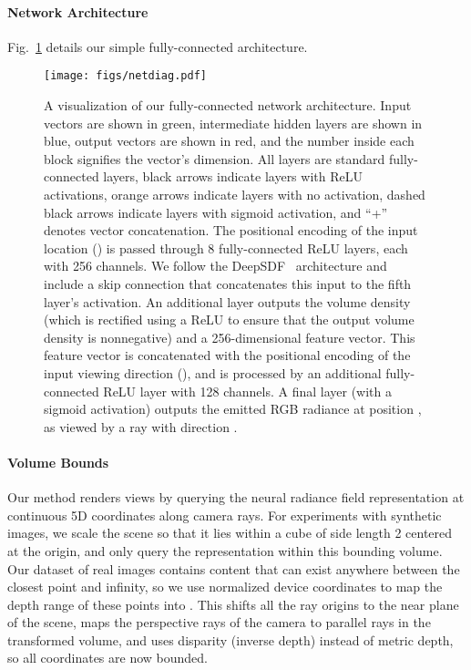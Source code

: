 \documentclass[runningheads]{llncs}
\begin{document}
\paragraph{\textbf{Network Architecture}}  
Fig.~\ref{fig:net} details our simple fully-connected architecture.


\begin{figure}[t]
\centering
\texttt{[image: figs/netdiag.pdf]}
\caption{A visualization of our fully-connected network architecture. Input vectors are shown in green, intermediate hidden layers are shown in blue, output vectors are shown in red, and the number inside each block signifies the vector's dimension. All layers are standard fully-connected layers, black arrows indicate layers with ReLU activations, orange arrows indicate layers with no activation, dashed black arrows indicate layers with sigmoid activation, and ``+'' denotes vector concatenation. The positional encoding of the input location () is passed through 8 fully-connected ReLU layers, each with 256 channels. We follow the DeepSDF~\cite{deepsdf} architecture and include a skip connection that concatenates this input to the fifth layer's activation. An additional layer outputs the volume density  (which is rectified using a ReLU to ensure that the output volume density is nonnegative) and a 256-dimensional feature vector. This feature vector is concatenated with the positional encoding of the input viewing direction (), and is processed by an additional fully-connected ReLU layer with 128 channels. A final layer (with a sigmoid activation) outputs the emitted RGB radiance at position , as viewed by a ray with direction .}
\label{fig:net}
\end{figure}


\paragraph{\textbf{Volume Bounds}}
Our method renders views by querying the neural radiance field representation at continuous 5D coordinates along camera rays. For experiments with synthetic images, we scale the scene so that it lies within a cube of side length 2 centered at the origin, and only query the representation within this bounding volume. Our dataset of real images contains content that can exist anywhere between the closest point and infinity, so we use normalized device coordinates to map the depth range of these points into . This shifts all the ray origins to the near plane of the scene, maps the perspective rays of the camera to parallel rays in the transformed volume, and uses disparity (inverse depth) instead of metric depth, so all coordinates are now bounded.
\end{document}
